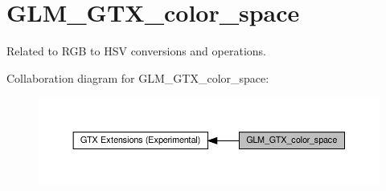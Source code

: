 \hypertarget{group__gtx__color__space}{}\section{G\+L\+M\+\_\+\+G\+T\+X\+\_\+color\+\_\+space}
\label{group__gtx__color__space}


Related to R\+GB to H\+SV conversions and operations.  


Collaboration diagram for G\+L\+M\+\_\+\+G\+T\+X\+\_\+color\+\_\+space\+:\nopagebreak
\begin{figure}[H]
\begin{center}
\leavevmode
\includegraphics[width=350pt]{group__gtx__color__space}
\end{center}
\end{figure}
